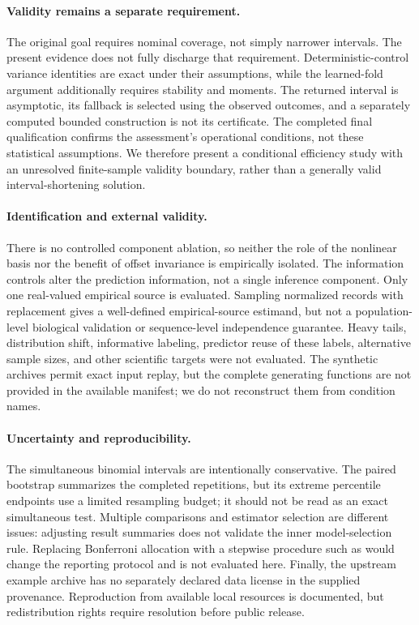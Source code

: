 \documentclass{article}
\begin{document}
\paragraph{Validity remains a separate requirement.}
The original goal requires nominal coverage, not simply narrower intervals. The present evidence does not fully discharge that requirement. Deterministic-control variance identities are exact under their assumptions, while the learned-fold argument additionally requires stability and moments. The returned interval is asymptotic, its fallback is selected using the observed outcomes, and a separately computed bounded construction is not its certificate. The completed final qualification confirms the assessment's operational conditions, not these statistical assumptions. We therefore present a conditional efficiency study with an unresolved finite-sample validity boundary, rather than a generally valid interval-shortening solution.

\paragraph{Identification and external validity.}
There is no controlled component ablation, so neither the role of the nonlinear basis nor the benefit of offset invariance is empirically isolated. The information controls alter the prediction information, not a single inference component. Only one real-valued empirical source is evaluated. Sampling normalized records with replacement gives a well-defined empirical-source estimand, but not a population-level biological validation or sequence-level independence guarantee. Heavy tails, distribution shift, informative labeling, predictor reuse of these labels, alternative sample sizes, and other scientific targets were not evaluated. The synthetic archives permit exact input replay, but the complete generating functions are not provided in the available manifest; we do not reconstruct them from condition names.

\paragraph{Uncertainty and reproducibility.}
The simultaneous binomial intervals are intentionally conservative. The paired bootstrap summarizes the completed repetitions, but its extreme percentile endpoints use a limited resampling budget; it should not be read as an exact simultaneous test. Multiple comparisons and estimator selection are different issues: adjusting result summaries does not validate the inner model-selection rule. Replacing Bonferroni allocation with a stepwise procedure such as \citet{Holm} would change the reporting protocol and is not evaluated here. Finally, the upstream example archive has no separately declared data license in the supplied provenance. Reproduction from available local resources is documented, but redistribution rights require resolution before public release.
\end{document}
